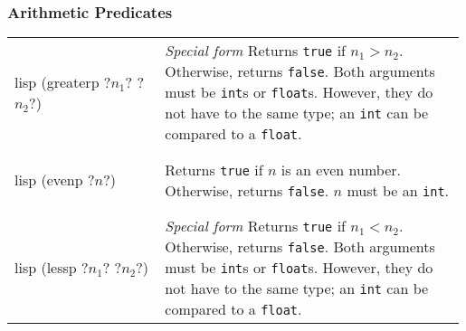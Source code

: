 \documentclass[a4paper, 12pt]{article}
\makeatletter
\newenvironment{funcdefs}
    {\begin{longtable}{@{} x{0.33\linewidth} @{} >{\raggedright\arraybackslash}p{0.66\linewidth} @{}}}
    {\end{longtable}}
\def\specialf/{\textit{Special form}\hspace{0.5em}}
\makeatother
\begin{document}
\subsubsection{Arithmetic Predicates}
\begin{funcdefs}
    \begin{minipage}[t]{\linewidth}
        \centering
        \begin{cminted}[autogobble=true, escapeinside=??]{lisp}
            (greaterp ?$n_1$? ?$n_2$?)
        \end{cminted}
    \end{minipage}
    & \specialf/ Returns \texttt{true} if $n_1 > n_2$. Otherwise, returns \texttt{false}. Both arguments must be \texttt{int}s or \texttt{float}s. However, they do not have to the same type; an \texttt{int} can be compared to a \texttt{float}.
    \\ \\
    \begin{minipage}[t]{\linewidth}
        \centering
        \begin{cminted}[autogobble=true, escapeinside=??]{lisp}
            (evenp ?$n$?)
        \end{cminted}
    \end{minipage}
    & Returns \texttt{true} if $n$ is an even number. Otherwise, returns \texttt{false}. $n$ must be an \texttt{int}.
    \\ \\
    \begin{minipage}[t]{\linewidth}
        \centering
        \begin{cminted}[autogobble=true, escapeinside=??]{lisp}
            (lessp ?$n_1$? ?$n_2$?)
        \end{cminted}
    \end{minipage}
    & \specialf/ Returns \texttt{true} if $n_1 < n_2$. Otherwise, returns \texttt{false}. Both arguments must be \texttt{int}s or \texttt{float}s. However, they do not have to the same type; an \texttt{int} can be compared to a \texttt{float}.
\end{funcdefs}
\end{document}

